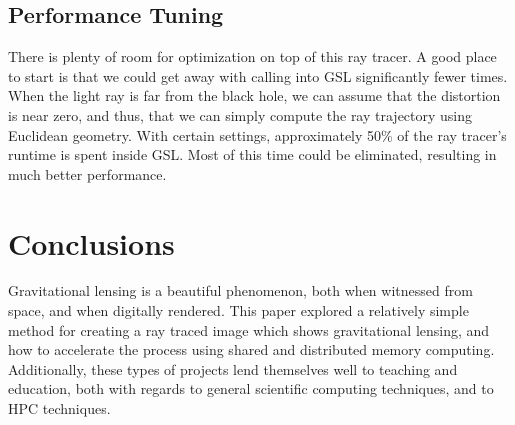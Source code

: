 \subsection{Performance Tuning}
There is plenty of room for optimization on top of this ray tracer. A good place to start is that we could get away with calling into GSL significantly fewer times. When the light ray is far from the black hole, we can assume that the distortion is near zero, and thus, that we can simply compute the ray trajectory using Euclidean geometry. With certain settings, approximately 50\% of the ray tracer's runtime is spent inside GSL. Most of this time could be eliminated, resulting in much better performance. 







\section{Conclusions}
\label{sec:concl}

Gravitational lensing is a beautiful phenomenon, both when witnessed from space, and when digitally rendered. This paper explored a relatively simple method for creating a ray traced image which shows gravitational lensing, and how to accelerate the process using shared and distributed memory computing. Additionally, these types of projects lend themselves well to teaching and education, both with regards to general scientific computing techniques, and to HPC techniques.


